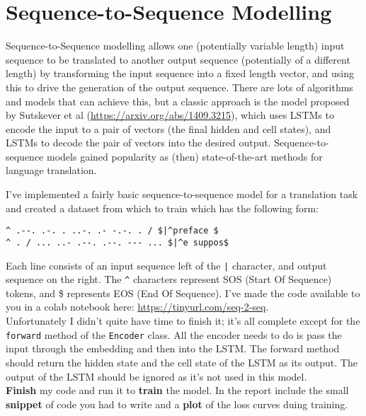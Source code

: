 \documentclass[a4paper]{article}
\begin{document}
\section{Sequence-to-Sequence Modelling}\label{init}
Sequence-to-Sequence modelling allows one (potentially variable length) input sequence to be translated to another output sequence (potentially of a different length) by transforming the input sequence into a fixed length vector, and using this to drive the generation of the output sequence. There are lots of algorithms and models that can achieve this, but a classic approach is the model proposed by Sutskever et al (\url{https://arxiv.org/abs/1409.3215}), which uses LSTMs to encode the input to a pair of vectors (the final hidden and cell states), and LSTMs to decode the pair of vectors into the desired output. Sequence-to-sequence models gained popularity as (then) state-of-the-art methods for language translation. 
\\[1em]
\begin{tcolorbox}[title=1.1 Complete and train a sequence-to-sequence model (2 marks)]
I've implemented a fairly basic sequence-to-sequence model for a translation task and created a dataset from which to train which has the following form:

\begin{verbatim}
^ .--. .-. . ..-. .- -.-. . / $|^preface $
^ . / ... ..- .--. .--. --- ... $|^e suppos$
\end{verbatim}

Each line consists of an input sequence left of the \verb_|_ character, and output sequence on the right. The \verb_^_ characters represent SOS (Start Of Sequence) tokens, and \$ represents EOS (End Of Sequence). I've made the code available to you in a colab notebook here: \url{https://tinyurl.com/seq-2-seq}.
\\[1em]
Unfortunately I didn't quite have time to finish it; it's all complete except for the \verb|forward| method of the \verb|Encoder| class. All the encoder needs to do is pass the input through the embedding and then into the LSTM. The forward method should return the hidden state and the cell state of the LSTM as its output. The output of the LSTM should be ignored as it's not used in this model.
\\[1em]
\textbf{Finish} my code and run it to \textbf{train} the model. In the report include the small \textbf{snippet} of code you had to write and a \textbf{plot} of the loss curves duing training. 

\end{tcolorbox}
\end{document}
